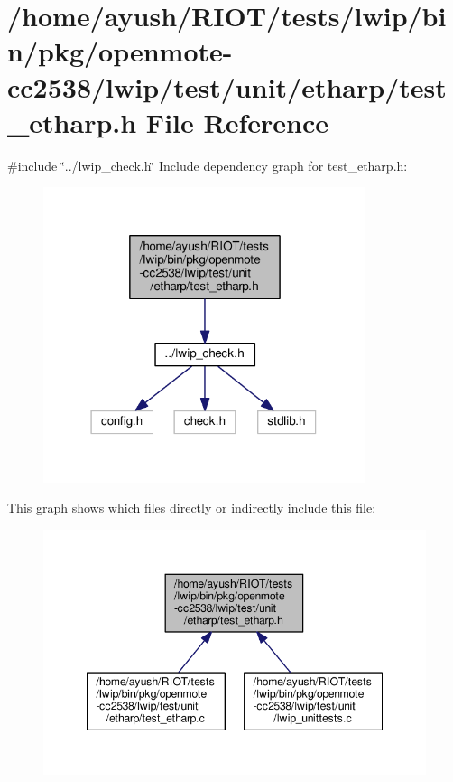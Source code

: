 \hypertarget{openmote-cc2538_2lwip_2test_2unit_2etharp_2test__etharp_8h}{}\section{/home/ayush/\+R\+I\+O\+T/tests/lwip/bin/pkg/openmote-\/cc2538/lwip/test/unit/etharp/test\+\_\+etharp.h File Reference}
\label{openmote-cc2538_2lwip_2test_2unit_2etharp_2test__etharp_8h}
{\ttfamily \#include \char`\"{}../lwip\+\_\+check.\+h\char`\"{}}\newline
Include dependency graph for test\+\_\+etharp.\+h\+:
\nopagebreak
\begin{figure}[H]
\begin{center}
\leavevmode
\includegraphics[width=267pt]{openmote-cc2538_2lwip_2test_2unit_2etharp_2test__etharp_8h__incl}
\end{center}
\end{figure}
This graph shows which files directly or indirectly include this file\+:
\nopagebreak
\begin{figure}[H]
\begin{center}
\leavevmode
\includegraphics[width=348pt]{openmote-cc2538_2lwip_2test_2unit_2etharp_2test__etharp_8h__dep__incl}
\end{center}
\end{figure}
